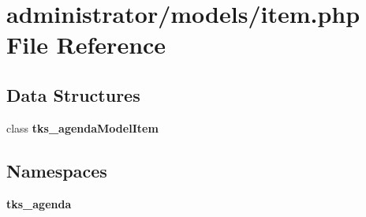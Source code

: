 \section{administrator/models/item.php File Reference}
\label{administrator_2models_2item_8php}
\subsection*{Data Structures}
\begin{DoxyCompactItemize}
\item 
class \textbf{ tks\+\_\+agenda\+Model\+Item}
\end{DoxyCompactItemize}
\subsection*{Namespaces}
\begin{DoxyCompactItemize}
\item 
 \textbf{ tks\+\_\+agenda}
\end{DoxyCompactItemize}
